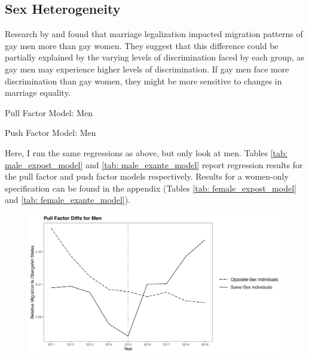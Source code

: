 \documentclass[12pt,letterpaper]{article}
\begin{document}
\subsection{Sex Heterogeneity}
Research by \citet{1} and \cite{12} found that marriage legalization impacted migration patterns of gay men more than gay women. They suggest that this difference could be partially explained by the varying levels of discrimination faced by each group, as gay men may experience higher levels of discrimination.  If gay men face more discrimination than gay women, they might be more sensitive to changes in marriage equality.
\begin{table}[htbp]
    \centering
    \caption{Pull Factor Model: Men}
    \label{tab: male_expost_model}
    
\end{table}
\begin{table}[htbp]
    \centering
    \caption{Push Factor Model: Men}
    \label{tab: male_exante_model}
    
\end{table}
Here, I run the same regressions as above, but only look at men. Tables \ref{tab: male_expost_model} and \ref{tab: male_exante_model} report regression results for the pull factor and push factor models respectively. Results for a women-only specification can be found in the appendix (Tables \ref{tab: female_expost_model} and \ref{tab: female_exante_model}).
\begin{figure}[htbp]
    \centering
    \includegraphics[width=1\linewidth]{outputs/summary_stats/men_post_diffs.png}
    \caption{}
    \label{fig: men_post_diffs}
\end{figure}
\end{document}
